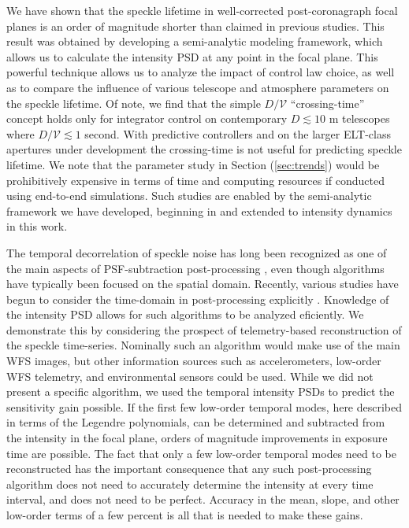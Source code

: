 \documentclass[10pt,preprint]{aastex631}
\begin{document}
We have shown that the speckle lifetime in well-corrected post-coronagraph focal planes is an order of magnitude shorter than claimed in previous studies.  This result was obtained by developing a semi-analytic modeling framework, which allows us to calculate the intensity PSD at any point in the focal plane.  This powerful technique allows us to analyze the impact of control law choice, as well as to compare the influence of various telescope and atmosphere parameters on the speckle lifetime.  Of note, we find that the simple $D/\mathcal{V}$ ``crossing-time'' concept holds only for integrator control on contemporary $D\lesssim10$ m telescopes where $D/\mathcal{V} \lesssim 1$ second.  With predictive controllers and on the larger ELT-class apertures under development the crossing-time is not useful for predicting speckle lifetime.  We  note that the parameter study in Section (\ref{sec:trends}) would be prohibitively expensive in terms of time and computing resources if conducted using end-to-end simulations.  Such studies are enabled by the semi-analytic framework we have developed, beginning in \citep{2018JATIS...4a9001M} and extended to intensity dynamics in this work.

The temporal decorrelation of speckle noise has long been recognized as one of the main aspects of PSF-subtraction post-processing \citep{2006ApJ...641..556M}, even though algorithms have typically been focused on the spatial domain.  Recently, various studies have begun to consider the time-domain in post-processing explicitly \citep{2021A&A...646A..24S}.  Knowledge of the intensity PSD allows for such algorithms to be analyzed eficiently.  We demonstrate this by considering the prospect of telemetry-based reconstruction of the speckle time-series.  Nominally such an algorithm would make use of the main WFS images, but other information sources such as accelerometers, low-order WFS telemetry, and environmental sensors could be used.  While we did not present a specific algorithm, we used the temporal intensity PSDs to predict the sensitivity gain possible.  If the first few low-order temporal modes, here described in terms of the Legendre polynomials, can be determined and subtracted from the intensity in the focal plane, orders of magnitude improvements in exposure time are possible.  The fact that only a few low-order temporal modes need to be reconstructed has the important consequence that any such post-processing algorithm does not need to accurately determine the intensity at every time interval, and does not need to be perfect.  Accuracy in the mean, slope, and other low-order terms of a few percent is all that is needed to make these gains.
\end{document}
